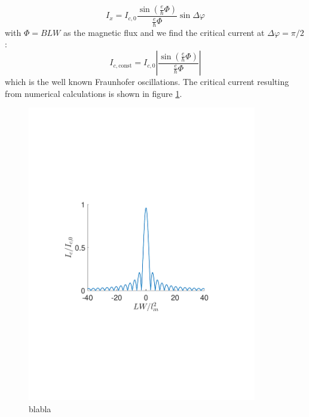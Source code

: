 \begin{equation}
I_x = I_{c,0}\frac{\sin\left(\frac{e}{\hbar}\Phi\right)}{\frac{e}{\hbar}\Phi}\sin \Delta \varphi
\end{equation}
with $\Phi = BLW$ as the magnetic flux and we find the critical current at $\Delta \varphi = \pi/2$:
\begin{equation}
I_{c,\mathrm{const}} = I_{c,0} \left|\frac{\sin\left(\frac{e}{\hbar}\Phi\right)}{\frac{e}{\hbar}\Phi}\right|
\end{equation}
which is the well known Fraunhofer oscillations. The critical current resulting from numerical calculations is shown in figure \ref{fig:Fraunhofer}.
\begin{figure}[hhh]
\centering
\includegraphics[width=10cm,clip=true,trim=3cm 8cm 3cm 8cm]{fig/Critical1}
\caption{blabla}
\label{fig:Fraunhofer}
\end{figure}
\\

